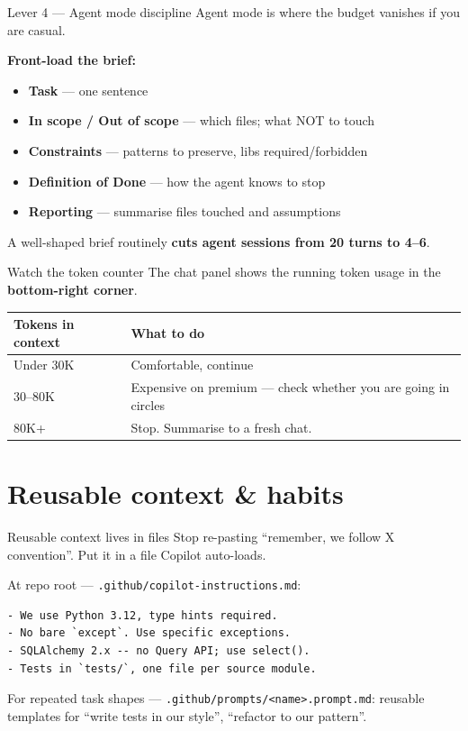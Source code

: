 \documentclass[11pt,aspectratio=169]{beamer}
\newcommand{\hl}[1]{\textbf{\textcolor{accentblue}{#1}}}
\begin{document}
\begin{frame}{Lever 4 --- Agent mode discipline}
  Agent mode is where the budget vanishes if you are casual.

  \medskip
  \textbf{Front-load the brief:}
  \begin{itemize}
    \item \textbf{Task} --- one sentence
    \item \textbf{In scope / Out of scope} --- which files; what NOT to touch
    \item \textbf{Constraints} --- patterns to preserve, libs required/forbidden
    \item \textbf{Definition of Done} --- how the agent knows to stop
    \item \textbf{Reporting} --- summarise files touched and assumptions
  \end{itemize}

  \vfill
  A well-shaped brief routinely \hl{cuts agent sessions from 20 turns to 4--6}.
\end{frame}

\begin{frame}{Watch the token counter}
  The chat panel shows the running token usage in the \hl{bottom-right corner}.

  \medskip
  \centering
  \begin{tabular}{ll}
    \toprule
    \textbf{Tokens in context} & \textbf{What to do} \\
    \midrule
    Under 30K & Comfortable, continue \\
    30--80K   & Expensive on premium --- check whether you are going in circles \\
    80K+      & Stop. Summarise to a fresh chat. \\
    \bottomrule
  \end{tabular}
\end{frame}

\section{Reusable context \& habits}

\begin{frame}[fragile]{Reusable context lives in files}
  Stop re-pasting ``remember, we follow X convention''. Put it in a file Copilot auto-loads.

  \medskip
  At repo root --- \texttt{.github/copilot-instructions.md}:
\begin{lstlisting}
- We use Python 3.12, type hints required.
- No bare `except`. Use specific exceptions.
- SQLAlchemy 2.x -- no Query API; use select().
- Tests in `tests/`, one file per source module.
\end{lstlisting}

  \medskip
  For repeated task shapes --- \texttt{.github/prompts/<name>.prompt.md}:
  reusable templates for ``write tests in our style'', ``refactor to our pattern''.
\end{frame}
\end{document}

